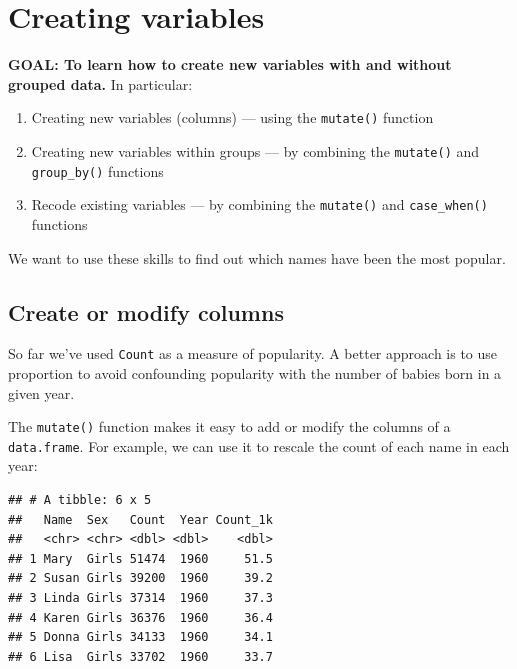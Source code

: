 \documentclass[]{book}
\newenvironment{Shaded}{\begin{snugshade}}{\end{snugshade}}
\newcommand{\CommentTok}[1]{\textcolor[rgb]{0.56,0.35,0.01}{\textit{#1}}}
\newcommand{\DataTypeTok}[1]{\textcolor[rgb]{0.13,0.29,0.53}{#1}}
\newcommand{\DecValTok}[1]{\textcolor[rgb]{0.00,0.00,0.81}{#1}}
\newcommand{\KeywordTok}[1]{\textcolor[rgb]{0.13,0.29,0.53}{\textbf{#1}}}
\newcommand{\NormalTok}[1]{#1}
\newcommand{\OperatorTok}[1]{\textcolor[rgb]{0.81,0.36,0.00}{\textbf{#1}}}
\newcommand{\StringTok}[1]{\textcolor[rgb]{0.31,0.60,0.02}{#1}}
\providecommand{\tightlist}{%
  \setlength{\itemsep}{0pt}\setlength{\parskip}{0pt}}
\begin{document}
\hypertarget{creating-variables}{%
\section{Creating variables}\label{creating-variables}}

\textbf{GOAL: To learn how to create new variables with and without grouped data.} In particular:

\begin{enumerate}
\def\labelenumi{\arabic{enumi}.}
\tightlist
\item
  Creating new variables (columns) --- using the \texttt{mutate()} function
\item
  Creating new variables within groups --- by combining the \texttt{mutate()} and \texttt{group\_by()} functions
\item
  Recode existing variables --- by combining the \texttt{mutate()} and \texttt{case\_when()} functions
\end{enumerate}

We want to use these skills to find out which names have been the most popular.

\hypertarget{create-or-modify-columns}{%
\subsection{Create or modify columns}\label{create-or-modify-columns}}

So far we've used \texttt{Count} as a measure of popularity. A better
approach is to use proportion to avoid confounding
popularity with the number of babies born in a given year.

The \texttt{mutate()} function makes it easy to add or modify the columns
of a \texttt{data.frame}. For example, we can use it to rescale the count
of each name in each year:

\begin{Shaded}
\end{Shaded}

\begin{verbatim}
## # A tibble: 6 x 5
##   Name  Sex   Count  Year Count_1k
##   <chr> <chr> <dbl> <dbl>    <dbl>
## 1 Mary  Girls 51474  1960     51.5
## 2 Susan Girls 39200  1960     39.2
## 3 Linda Girls 37314  1960     37.3
## 4 Karen Girls 36376  1960     36.4
## 5 Donna Girls 34133  1960     34.1
## 6 Lisa  Girls 33702  1960     33.7
\end{verbatim}
\end{document}
